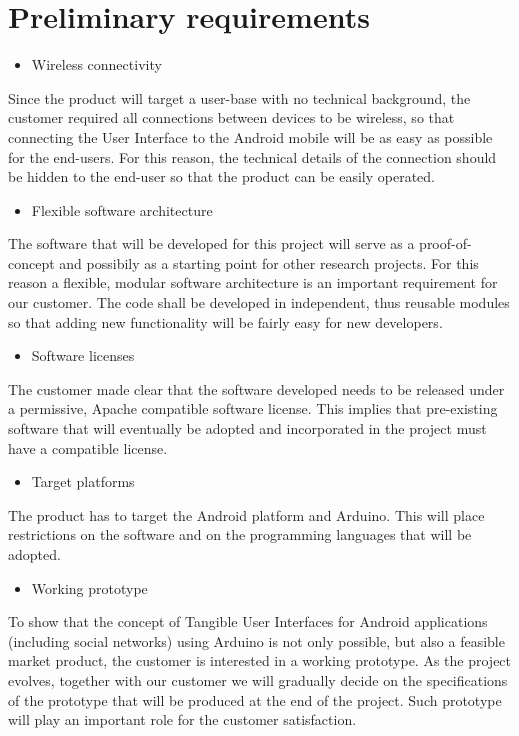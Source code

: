 
\section{Preliminary requirements}
\begin{itemize}
\item Wireless connectivity
\end{itemize}
Since the product will target a user-base with no technical background,
the customer required all connections between devices to be wireless,
so that connecting the User Interface to the Android mobile will be
as easy as possible for the end-users. For this reason, the technical
details of the connection should be hidden to the end-user so that
the product can be easily operated.
\begin{itemize}
\item Flexible software architecture
\end{itemize}
The software that will be developed for this project will serve as
a proof-of-concept and possibily as a starting point for other research
projects. For this reason a flexible, modular software architecture
is an important requirement for our customer. The code shall be developed
in independent, thus reusable modules so that adding new functionality
will be fairly easy for new developers.
\begin{itemize}
\item Software licenses
\end{itemize}
The customer made clear that the software developed needs to be released
under a permissive, Apache compatible software license. This implies
that pre-existing software that will eventually be adopted and incorporated
in the project must have a compatible license.
\begin{itemize}
\item Target platforms
\end{itemize}
The product has to target the Android platform and Arduino.
This will place restrictions on the software and on the programming languages that will be adopted.
\begin{itemize}
\item Working prototype
\end{itemize}
To show that the concept of Tangible User Interfaces for Android applications
(including social networks) using Arduino is not only possible, but
also a feasible market product, the customer is interested in a working
prototype. As the project evolves, together with our customer we will
gradually decide on the specifications of the prototype that will
be produced at the end of the project. Such prototype will play an
important role for the customer satisfaction.
